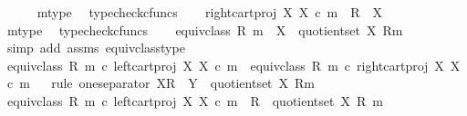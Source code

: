 \begin{isabellebody}
\ \ \ \ \isamarkupfalse%
\ m{\isacharunderscore}{\kern0pt}type\ \isamarkupfalse%
\ typecheck{\isacharunderscore}{\kern0pt}cfuncs\isanewline
\ \ \isamarkupfalse%
\ {\isachardoublequoteopen}right{\isacharunderscore}{\kern0pt}cart{\isacharunderscore}{\kern0pt}proj\ X\ X\ {\isasymcirc}\isactrlsub c\ m\ {\isacharcolon}{\kern0pt}\ R\ {\isasymrightarrow}\ X{\isachardoublequoteclose}\isanewline
\ \ \ \ \isamarkupfalse%
\ m{\isacharunderscore}{\kern0pt}type\ \isamarkupfalse%
\ typecheck{\isacharunderscore}{\kern0pt}cfuncs\isanewline
\ \ \isamarkupfalse%
\ {\isachardoublequoteopen}equiv{\isacharunderscore}{\kern0pt}class\ {\isacharparenleft}{\kern0pt}R{\isacharcomma}{\kern0pt}\ m{\isacharparenright}{\kern0pt}\ {\isacharcolon}{\kern0pt}\ X\ {\isasymrightarrow}\ quotient{\isacharunderscore}{\kern0pt}set\ X\ {\isacharparenleft}{\kern0pt}R{\isacharcomma}{\kern0pt}m{\isacharparenright}{\kern0pt}{\isachardoublequoteclose}\isanewline
\ \ \ \ \isamarkupfalse%
\ {\isacharparenleft}{\kern0pt}simp\ add{\isacharcolon}{\kern0pt}\ assms\ equiv{\isacharunderscore}{\kern0pt}class{\isacharunderscore}{\kern0pt}type{\isacharparenright}{\kern0pt}\isanewline
\ \ \isamarkupfalse%
\ {\isachardoublequoteopen}equiv{\isacharunderscore}{\kern0pt}class\ {\isacharparenleft}{\kern0pt}R{\isacharcomma}{\kern0pt}\ m{\isacharparenright}{\kern0pt}\ {\isasymcirc}\isactrlsub c\ left{\isacharunderscore}{\kern0pt}cart{\isacharunderscore}{\kern0pt}proj\ X\ X\ {\isasymcirc}\isactrlsub c\ m\ {\isacharequal}{\kern0pt}\ equiv{\isacharunderscore}{\kern0pt}class\ {\isacharparenleft}{\kern0pt}R{\isacharcomma}{\kern0pt}\ m{\isacharparenright}{\kern0pt}\ {\isasymcirc}\isactrlsub c\ right{\isacharunderscore}{\kern0pt}cart{\isacharunderscore}{\kern0pt}proj\ X\ X\ {\isasymcirc}\isactrlsub c\ m{\isachardoublequoteclose}\isanewline
\ \ \isamarkupfalse%
{\isacharparenleft}{\kern0pt}rule\ one{\isacharunderscore}{\kern0pt}separator{\isacharbrackleft}{\kern0pt}\ X{\isacharequal}{\kern0pt}{\isachardoublequoteopen}R{\isachardoublequoteclose}{\isacharcomma}{\kern0pt}\ \ Y\ {\isacharequal}{\kern0pt}\ {\isachardoublequoteopen}quotient{\isacharunderscore}{\kern0pt}set\ X\ {\isacharparenleft}{\kern0pt}R{\isacharcomma}{\kern0pt}m{\isacharparenright}{\kern0pt}{\isachardoublequoteclose}{\isacharbrackright}{\kern0pt}{\isacharparenright}{\kern0pt}\isanewline
\ \ \ \ \isamarkupfalse%
\ {\isachardoublequoteopen}equiv{\isacharunderscore}{\kern0pt}class\ {\isacharparenleft}{\kern0pt}R{\isacharcomma}{\kern0pt}\ m{\isacharparenright}{\kern0pt}\ {\isasymcirc}\isactrlsub c\ left{\isacharunderscore}{\kern0pt}cart{\isacharunderscore}{\kern0pt}proj\ X\ X\ {\isasymcirc}\isactrlsub c\ m\ {\isacharcolon}{\kern0pt}\ R\ {\isasymrightarrow}\ quotient{\isacharunderscore}{\kern0pt}set\ X\ {\isacharparenleft}{\kern0pt}R{\isacharcomma}{\kern0pt}\ m{\isacharparenright}{\kern0pt}{\isachardoublequoteclose}\isanewline

\end{isabellebody}
